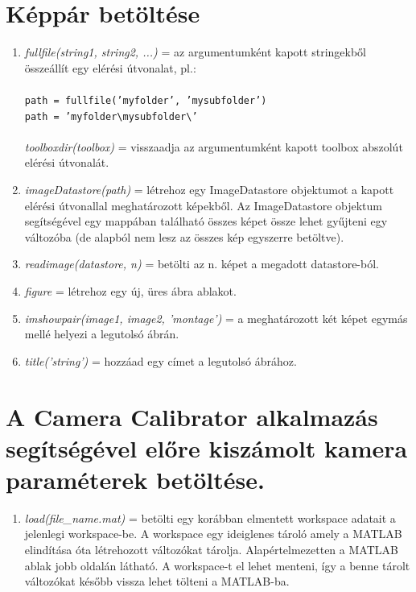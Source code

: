 \documentclass[12pt]{report}
\begin{document}
        \section{Képpár betöltése}
            \begin{enumerate}
                \item \textit{fullfile(string1, string2, ...)} = az argumentumként kapott stringekből összeállít egy elérési útvonalat, pl.:\\\\
                    \texttt{path = fullfile('myfolder', 'mysubfolder')\\path = 'myfolder\textbackslash mysubfolder\textbackslash '}\\\\
                    \textit{toolboxdir(toolbox)} = visszaadja az argumentumként kapott toolbox abszolút elérési útvonalát.
                \item \textit{imageDatastore(path)} = létrehoz egy ImageDatastore objektumot a kapott elérési útvonallal meghatározott képekből. Az ImageDatastore objektum segítségével egy mappában található összes képet össze lehet gyűjteni egy változóba (de alapból nem lesz az összes kép egyszerre betöltve).
                \item \textit{readimage(datastore, n)} = betölti az n. képet a megadott datastore-ból.
                \item \textit{figure} = létrehoz egy új, üres ábra ablakot.
                \item \textit{imshowpair(image1, image2, 'montage')} = a meghatározott két képet egymás mellé helyezi a legutolsó ábrán.
                \item \textit{title('string')} = hozzáad egy címet a legutolsó ábrához.
            \end{enumerate}

        \section{A Camera Calibrator alkalmazás segítségével előre kiszámolt kamera paraméterek betöltése.}
            \begin{enumerate}
                    \item \textit{load(file\_name.mat)} = betölti egy korábban elmentett workspace adatait a jelenlegi workspace-be. A workspace egy ideiglenes tároló amely a MATLAB elindítása óta létrehozott változókat tárolja. Alapértelmezetten a MATLAB ablak jobb oldalán látható. A workspace-t el lehet menteni, így a benne tárolt változókat később vissza lehet tölteni a MATLAB-ba.
            \end{enumerate}
\end{document}
